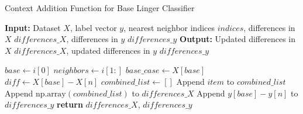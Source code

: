 \documentclass[a4paper, 12pt]{report}
\begin{document}
\begin{algorithm}[H]
    \caption{Context Addition Function for Base Linger Classifier}
    \textbf{Input:} Dataset $X$, label vector $y$, nearest neighbor indices $indices$, differences in $X$ $differences\_X$, differences in $y$ $differences\_y$
    \textbf{Output:} Updated differences in $X$ $differences\_X$, updated differences in $y$ $differences\_y$
    \label{alg:context_addition_fit}
    \begin{algorithmic}[1]
                \State $base \gets i[0]$
                \State $neighbors \gets i[1:]$
                    \State $base\_case \gets X[base]$
                    \State $diff \gets X[base] - X[n]$
                    \State $combined\_list \gets []$
                            \State Append $item$ to $combined\_list$
                        \EndFor
                    \EndFor
                    \State Append $\text{np.array}(combined\_list)$ to $differences\_X$
                    \State Append $y[base] - y[n]$ to $differences\_y$
                \EndFor
            \EndFor
            \State \textbf{return} $differences\_X$, $differences\_y$
        \EndFunction
    \end{algorithmic}
\end{algorithm}
\end{document}
